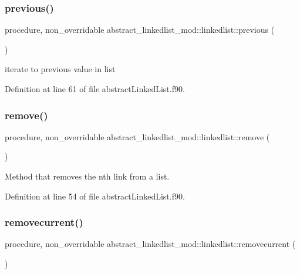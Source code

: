 \subsubsection{\texorpdfstring{previous()}{previous()}}
{\footnotesize\ttfamily procedure, non\+\_\+overridable abstract\+\_\+linkedlist\+\_\+mod\+::linkedlist\+::previous (\begin{DoxyParamCaption}{ }\end{DoxyParamCaption})\hspace{0.3cm}{\ttfamily [private]}}



iterate to previous value in list 



Definition at line 61 of file abstract\+Linked\+List.\+f90.

\mbox{\label{structabstract__linkedlist__mod_1_1linkedlist_a8d5f5b478ec685dfdc93cb491d2d30f9}} 
\subsubsection{\texorpdfstring{remove()}{remove()}}
{\footnotesize\ttfamily procedure, non\+\_\+overridable abstract\+\_\+linkedlist\+\_\+mod\+::linkedlist\+::remove (\begin{DoxyParamCaption}{ }\end{DoxyParamCaption})\hspace{0.3cm}{\ttfamily [private]}}



Method that removes the nth link from a list. 



Definition at line 54 of file abstract\+Linked\+List.\+f90.

\mbox{\label{structabstract__linkedlist__mod_1_1linkedlist_a7bca8c31961be692d5c377c309d6cbd2}} 
\subsubsection{\texorpdfstring{removecurrent()}{removecurrent()}}
{\footnotesize\ttfamily procedure, non\+\_\+overridable abstract\+\_\+linkedlist\+\_\+mod\+::linkedlist\+::removecurrent (\begin{DoxyParamCaption}{ }\end{DoxyParamCaption})\hspace{0.3cm}{\ttfamily [private]}}



